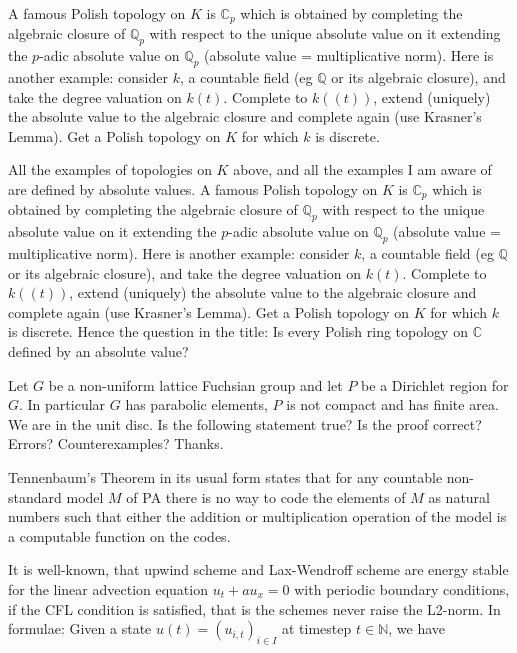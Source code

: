 \documentclass[12pt,letterpaper]{book}
\begin{document}
A famous Polish topology on $K$ is $\mathbb{C}_p$ which is obtained by completing the algebraic closure of $\mathbb{Q}_p$ with respect to the unique absolute value on it extending the $p$-adic absolute value on $\mathbb{Q}_p$ (absolute value = multiplicative norm). Here is another example: consider $k$, a countable field (eg $\mathbb{Q}$ or its algebraic closure), and take the degree valuation on $k(t)$. Complete to $k((t))$, extend (uniquely) the absolute value to the algebraic closure and complete again (use Krasner's Lemma). Get a Polish topology on $K$ for which $k$ is discrete.

All the examples of topologies on $K$ above, and all the examples I am aware of
are defined by absolute values. 
A famous Polish topology on $K$ is $\mathbb{C}_p$ which is obtained by completing the algebraic closure of $\mathbb{Q}_p$ with respect to the unique absolute value on it extending the $p$-adic absolute value on $\mathbb{Q}_p$ (absolute value = multiplicative norm). Here is another example: consider $k$, a countable field (eg $\mathbb{Q}$ or its algebraic closure), and take the degree valuation on $k(t)$. Complete to $k((t))$, extend (uniquely) the absolute value to the algebraic closure and complete again (use Krasner's Lemma). Get a Polish topology on $K$ for which $k$ is discrete.
Hence the question in the title: Is every Polish ring topology on $\mathbb{C}$ defined by an absolute value?

Let $G$ be a non-uniform lattice Fuchsian group and let $P$ be a Dirichlet region for $G$. In particular $G$ has parabolic elements, $P$ is not compact and has finite area. We are in the unit disc. Is the following statement true? Is the proof correct? Errors? Counterexamples? Thanks.

Tennenbaum's Theorem in its usual form states that for any countable non-standard model $M$ of PA there is no way to code the elements of $M$ as natural numbers such that either the addition or multiplication operation of the model is a computable function on the codes.

It is well-known, that upwind scheme and Lax-Wendroff scheme are energy stable for the linear advection equation $u_t +a u_x = 0$ with periodic boundary conditions, if the CFL condition is satisfied, that is the schemes never raise the L2-norm.
In formulae: Given a state $u(t)=(u_{i,t})_{i \in I}$ at timestep $t \in \mathbb{N}$, we have
\end{document}
